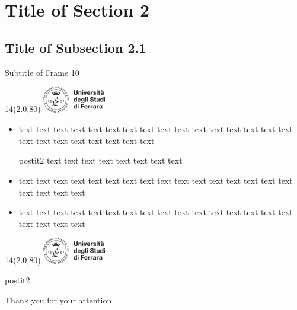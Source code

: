 \documentclass[11pt,xcolor={dvipsnames},default]{beamer} %
\newcommand{\MyLogo}{%
\begin{textblock}{14}(2.0,80)
 \includegraphics[height=1.15cm, angle=0]{logo}
\end{textblock}
}
\begin{document}
\section{Title of Section 2}

\subsection{Title of Subsection 2.1}
\begin{frame}{Subtitle of Frame 10}
\transboxin
\MyLogo
\begin{itemize}
\item<1-> text text text text text text text text text text text text text text text text text text text text text text text text
\begin{beamercolorbox}[center, shadow=false, rounded=true]{postit2}
text text text text text text text text 
\end{beamercolorbox}
\item<2->  text text text text text text text text text text text text text text text text text text text text
\item<3->  text text text text text text text text text text text text text text text text text text text text
\end{itemize}
\end{frame}

%
%


\begin{frame}
\transboxin
\MyLogo
\vspace{1.0cm}
\begin{beamercolorbox}[sep=1.0cm, center, shadow=false, rounded=true]{postit2}
\begin{Huge}Thank you for your attention\end{Huge}
\end{beamercolorbox}
\pause
\end{frame}

\fi
\end{document}

